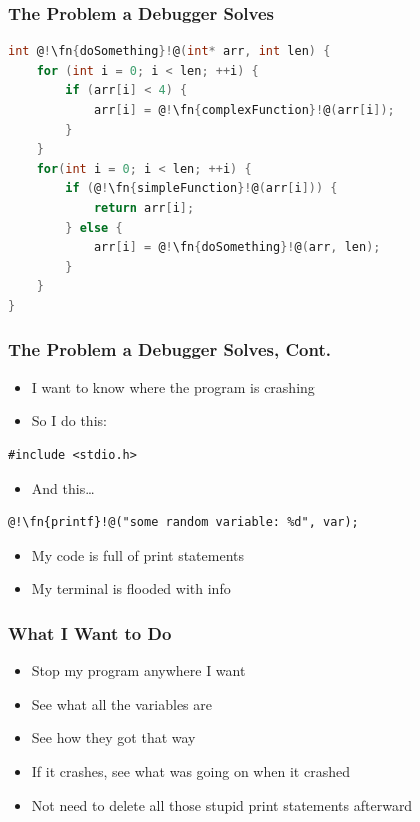 \documentclass[aspectratio=169]{beamer}
\newcommand{\fn}{\color{identifier}}
\begin{document}
\begin{frame}[fragile]
    \frametitle{The Problem a Debugger Solves}
    \begin{lstlisting}[language=C]
int @!\fn{doSomething}!@(int* arr, int len) {
    for (int i = 0; i < len; ++i) {
        if (arr[i] < 4) {
            arr[i] = @!\fn{complexFunction}!@(arr[i]);
        }
    }
    for(int i = 0; i < len; ++i) {
        if (@!\fn{simpleFunction}!@(arr[i])) {
            return arr[i];
        } else {
            arr[i] = @!\fn{doSomething}!@(arr, len);
        }
    }
}
    \end{lstlisting}

\end{frame}
\begin{frame}[fragile]
    \frametitle{The Problem a Debugger Solves, Cont.}
    \begin{itemize}
        \item I want to know where the program is crashing
        \item So I do this:
    \end{itemize}
    \begin{lstlisting}[numbers=none]
#include <stdio.h>
    \end{lstlisting}
    \begin{itemize}
        \pause
        \item And this\dots
    \end{itemize}
    \begin{lstlisting}[numbers=none]
@!\fn{printf}!@("some random variable: %d", var);
    \end{lstlisting}
    \begin{itemize}
        \pause
        \item My code is full of print statements
        \item My terminal is flooded with info
    \end{itemize}


\end{frame}
\begin{frame}
    \frametitle{What I Want to Do}

    \begin{itemize}
        \item Stop my program anywhere I want
        \item See what all the variables are
        \item See how they got that way
        \item If it crashes, see what was going on when it crashed
        \item Not need to delete all those stupid print statements afterward
    \end{itemize}

\end{frame}
\end{document}
